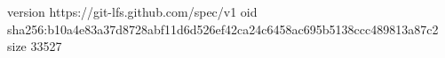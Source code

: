 version https://git-lfs.github.com/spec/v1
oid sha256:b10a4e83a37d8728abf11d6d526ef42ca24c6458ac695b5138ccc489813a87c2
size 33527
